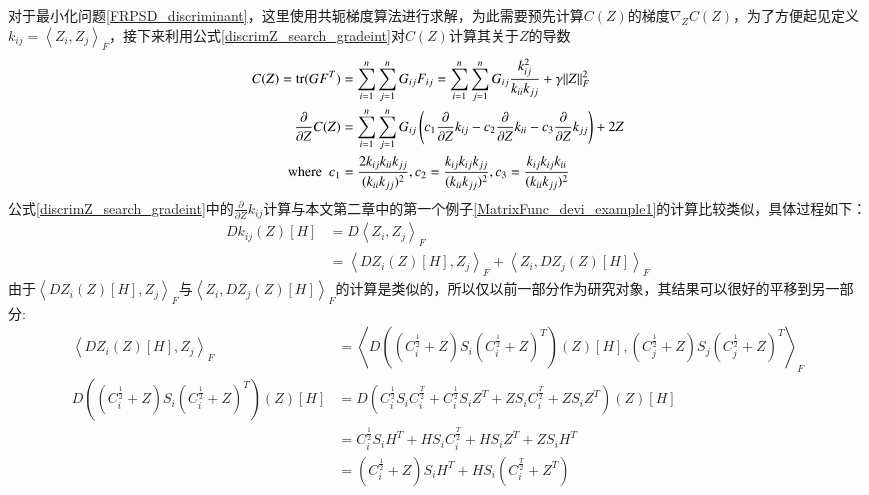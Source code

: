 对于最小化问题\ref{FRPSD_discriminant}，这里使用共轭梯度算法进行求解，为此需要预先计算$C(Z)$的梯度$\nabla_{Z}C(Z)$，为了方便起见定义$k_{ij}=\left<Z_{i},Z_{j}\right>_{F}$，接下来利用公式\ref{discrimZ_search_gradeint}对$C(Z)$计算其关于$Z$的导数
\begin{equation}
\label{discrimZ_search_gradeint}
\begin{split}
C(Z)={\rm tr}(GF^{T})&=\sum_{i=1}^{n}\sum_{j=1}^{n}G_{ij}F_{ij}=\sum_{i=1}^{n}\sum_{j=1}^{n}G_{ij}\frac{k_{ij}^2}{k_{ii}k_{jj}}+\gamma\|Z\|_{F}^{2}\\
\frac{\partial}{\partial Z}C(Z)&=\sum_{i=1}^{n}\sum_{j=1}^{n}G_{ij}\left(c_1\frac{\partial}{\partial Z}k_{ij}-c_2\frac{\partial}{\partial Z}k_{ii}-c_3\frac{\partial}{\partial Z}k_{jj}\right)+2Z\\
{\rm where~~}c_1&=\frac{2k_{ij}k_{ii}k_{jj}}{(k_{ii}k_{jj})^2},c_2=\frac{k_{ij}k_{ij}k_{jj}}{(k_{ii}k_{jj})^2},c_3=\frac{k_{ij}k_{ij}k_{ii}}{(k_{ii}k_{jj})^2}
\end{split}
\end{equation}
公式\ref{discrimZ_search_gradeint}中的$\frac{\partial}{\partial Z}k_{ij}$计算与本文第二章中的第一个例子\ref{MatrixFunc_devi_example1}的计算比较类似，具体过程如下：
\begin{equation}
\label{discrimZ_search_part1_gradeint}
\begin{split}
Dk_{ij}(Z)[H]&=D\left<Z_i,Z_j\right>_{F}\\
&=\left<DZ_i(Z)[H],Z_j\right>_{F}+\left<Z_i,DZ_j(Z)[H]\right>_{F}
\end{split}
\end{equation}
由于$\left<DZ_i(Z)[H],Z_j\right>_{F}$与$\left<Z_i,DZ_j(Z)[H]\right>_{F}$的计算是类似的，所以仅以前一部分作为研究对象，其结果可以很好的平移到另一部分:
\begin{equation}
\label{discrimZ_search_part2_gradeint}
\begin{split}
\left<DZ_i(Z)[H],Z_j\right>_{F}&=\left<D\left((C_{i}^{\frac{1}{2}}+Z)S_{i}(C_{i}^{\frac{1}{2}}+Z)^{T}\right)(Z)[H],(C_{j}^{\frac{1}{2}}+Z)S_{j}(C_{j}^{\frac{1}{2}}+Z)^{T}\right>_{F}\\
D\left((C_{i}^{\frac{1}{2}}+Z)S_{i}(C_{i}^{\frac{1}{2}}+Z)^{T}\right)(Z)[H]&=D(C_{i}^{\frac{1}{2}}S_{i}C_{i}^{\frac{T}{2}}+C_{i}^{\frac{1}{2}}S_{i}Z^{T}+ZS_{i}C_{i}^{\frac{T}{2}}+ZS_{i}Z^{T})(Z)[H]\\
&=C_{i}^{\frac{1}{2}}S_{i}H^{T}+HS_{i}C_{i}^{\frac{T}{2}}+HS_{i}Z^{T}+ZS_{i}H^{T}\\
&=(C_{i}^{\frac{1}{2}}+Z)S_{i}H^{T}+HS_{i}(C_{i}^{\frac{T}{2}}+Z^{T})
\end{split}
\end{equation}
